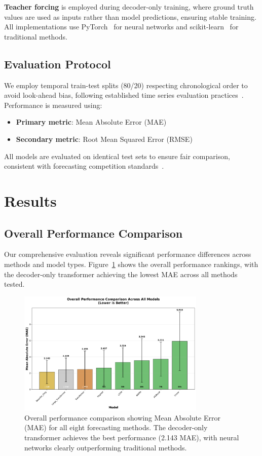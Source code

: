 \documentclass[11pt]{article}
\begin{document}
\textbf{Teacher forcing} is employed during decoder-only training, where ground truth values are used as inputs rather than model predictions, ensuring stable training. All implementations use PyTorch~\cite{paszke2019pytorch} for neural networks and scikit-learn~\cite{pedregosa2011scikit} for traditional methods.

\subsection{Evaluation Protocol}

We employ temporal train-test splits (80/20) respecting chronological order to avoid look-ahead bias, following established time series evaluation practices~\cite{hyndman2018forecasting}. Performance is measured using:
\begin{itemize}
\item \textbf{Primary metric}: Mean Absolute Error (MAE)
\item \textbf{Secondary metric}: Root Mean Squared Error (RMSE)
\end{itemize}

All models are evaluated on identical test sets to ensure fair comparison, consistent with forecasting competition standards~\cite{makridakis2020m4}.

\section{Results}

\subsection{Overall Performance Comparison}

Our comprehensive evaluation reveals significant performance differences across methods and model types. Figure~\ref{fig:overall_performance} shows the overall performance rankings, with the decoder-only transformer achieving the lowest MAE across all methods tested.

\begin{figure}[h]
\centering
\includegraphics[width=0.8\textwidth]{results/figure1_overall_performance.png}
\caption{Overall performance comparison showing Mean Absolute Error (MAE) for all eight forecasting methods. The decoder-only transformer achieves the best performance (2.143 MAE), with neural networks clearly outperforming traditional methods.}
\label{fig:overall_performance}
\end{figure}
\end{document}
